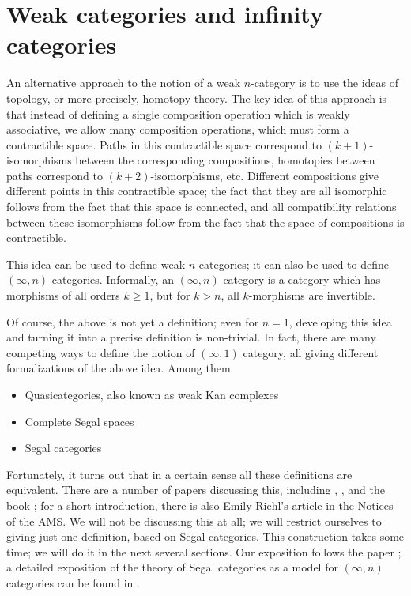 
\section{Weak categories and infinity categories}\label{s:infinity-categories}

An alternative approach to the notion of a weak $n$-category is to use the
ideas of topology, or more precisely, homotopy theory. The key idea of this
approach is that instead of defining a single composition operation which is
weakly associative, we allow many composition operations, which must form a
contractible space. Paths in this contractible space correspond to
$(k+1)$-isomorphisms between the corresponding compositions, homotopies between
paths correspond to $(k+2)$-isomorphisms, etc. Different compositions give
different points in this contractible space; the fact that they are all
isomorphic follows from the fact that this space is connected, and all
compatibility relations between these isomorphisms follow from the fact that the
space of compositions is contractible.

This idea can be used to define weak $n$-categories; it can also be used to
define $(\infty, n)$ categories. Informally, an $(\infty, n)$ category is a
category which has morphisms of all orders $k \ge 1$, but for $k>n$, all
$k$-morphisms are invertible.


Of course, the above is not yet a definition; even for $n=1$, developing this
idea and turning it into a precise definition is non-trivial. In fact, there are
many competing ways to define the notion of $(\infty, 1)$ category, all giving
different formalizations of the above idea. Among them:

\begin{itemize}
  \item Quasicategories, also known as weak Kan complexes
  \item Complete Segal spaces
  \item Segal categories
\end{itemize}

Fortunately, it turns out that in a certain sense all these definitions are
equivalent. There are a number of papers discussing this, including
\cite{toen}, \cite{bsp}, and the book \cite{riehl-verity}; for a short
introduction, there is also Emily Riehl's article \cite{riehl-notices} in
the Notices of the AMS. We will not be discussing this at all; we will restrict
ourselves to giving just one definition, based on Segal categories. This
construction takes some time; we will do it in the next several sections. Our
exposition follows the paper \cite{schommer-pries-category}; a detailed exposition of
the theory of Segal categories as a model for $(\infty, n)$ categories can be
found in \cite{simpson}.




